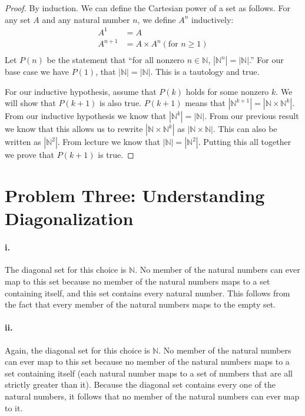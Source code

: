 \documentclass[10pt,letter]{article}
\begin{document}
\begin{proof} By induction. We can define the Cartesian power of a set as follows. For any set $A$ and any natural number $n$, we define $A^n$ inductively:
\begin{align*}
A^1 &= A \\
A^{n+1} &= A \times A^n (\text{for } n \ge 1)\\
\end{align*}
Let $P(n)$ be the statement that ``for all nonzero $n \in \mathbb{N}$, $|\mathbb{N}^n| = |\mathbb{N}|$.'' For our base case we have $P(1)$, that $|\mathbb{N}| = |\mathbb{N}|$. This is a tautology and true.

For our inductive hypothesis, assume that $P(k)$ holds for some nonzero $k$. We will show that $P(k+1)$ is also true. $P(k+1)$ means that $|\mathbb{N}^{k+1}| = |\mathbb{N} \times \mathbb{N}^k|$. From our inductive hypothesis we know that $|\mathbb{N}^k| = |\mathbb{N}|$. From our previous result we know that this allows us to rewrite $|\mathbb{N} \times \mathbb{N}^k|$ as $|\mathbb{N} \times \mathbb{N}|$. This can also be written as $|\mathbb{N}^2|$. From lecture we know that $|\mathbb{N}| = |\mathbb{N}^2|$. Putting this all together we prove that $P(k+1)$ is true.
\end{proof}


\section*{Problem Three: Understanding Diagonalization}

\paragraph{i.} The diagonal set for this choice is $\mathbb{N}$. No member of the natural numbers can ever map to this set because no member of the natural numbers maps to a set containing itself, and this set contains every natural number. This follows from the fact that every member of the natural numbers maps to the empty set.

\paragraph{ii.} Again, the diagonal set for this choice is $\mathbb{N}$. No member of the natural numbers can ever map to this set because no member of the natural numbers maps to a set containing itself (each natural number maps to a set of numbers that are all strictly greater than it). Because the diagonal set contains every one of the natural numbers, it follows that no member of the natural numbers can ever map to it.
\end{document}
